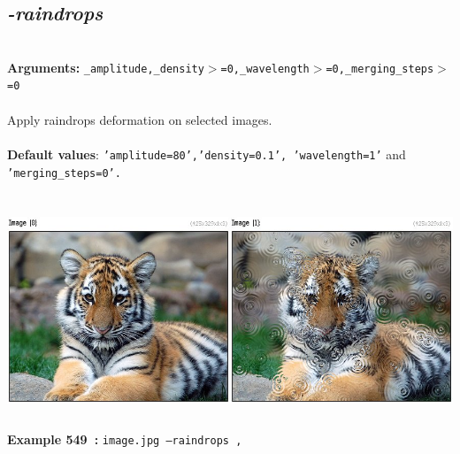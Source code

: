 \documentclass[a4paper,11pt,twoside]{book}
\begin{document}
\subsection{\emph{-raindrops} }\vspace*{-0.5em}
~\\\textbf{Arguments: } 
{\small \texttt{\_amplitude,\_density$>$=0,\_wavelength$>$=0,\_merging\_steps$>$=0}}\\~\\
Apply raindrops deformation on selected images.
~\\~\\\textbf{Default values}: {\small \texttt{'amplitude=80','density=0.1', 'wavelength=1'} and \texttt{'merging\_steps=0'.}}
\begin{center}\includegraphics[keepaspectratio=true,height=7cm,width=\textwidth]{img/gmic_def549.jpg}\\
{\footnotesize \textbf{Example 549~:} \texttt{image.jpg --raindrops ,}}
\end{center}
\end{document}
